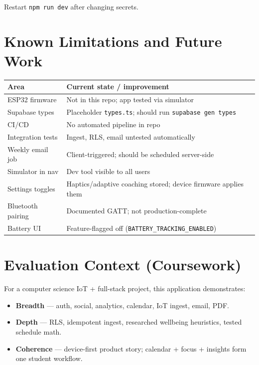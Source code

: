 \documentclass[11pt,a4paper]{article}
\newcommand{\filepath}[1]{\texttt{#1}}
\begin{document}
Restart \texttt{npm run dev} after changing secrets.

\section{Known Limitations and Future Work}

\begin{table}[h]
\centering
\small
\begin{tabular}{@{}p{4.2cm}p{7.5cm}@{}}
\toprule
\textbf{Area} & \textbf{Current state / improvement} \\
\midrule
ESP32 firmware & Not in this repo; app tested via simulator \\
Supabase types & Placeholder \filepath{types.ts}; should run \texttt{supabase gen types} \\
CI/CD & No automated pipeline in repo \\
Integration tests & Ingest, RLS, email untested automatically \\
Weekly email job & Client-triggered; should be scheduled server-side \\
Simulator in nav & Dev tool visible to all users \\
Settings toggles & Haptics/adaptive coaching stored; device firmware applies them \\
Bluetooth pairing & Documented GATT; not production-complete \\
Battery UI & Feature-flagged off (\filepath{BATTERY\_TRACKING\_ENABLED}) \\
\bottomrule
\end{tabular}
\end{table}

\section{Evaluation Context (Coursework)}

For a computer science IoT + full-stack project, this application demonstrates:

\begin{itemize}[leftmargin=*]
  \item \textbf{Breadth} --- auth, social, analytics, calendar, IoT ingest, email, PDF.
  \item \textbf{Depth} --- RLS, idempotent ingest, researched wellbeing heuristics, tested schedule math.
  \item \textbf{Coherence} --- device-first product story; calendar + focus + insights form one student workflow.
\end{itemize}
\end{document}
